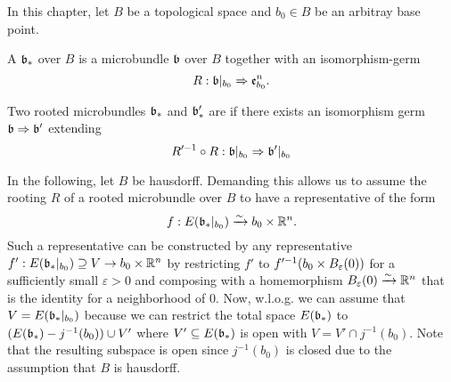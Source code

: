 In this chapter, let $B$ be a topological space and $b_0 \in B$ be an arbitray base point.
\begin{mydefinition}
    A  $\mathfrak{b}_*$ over $B$ is a microbundle $\mathfrak{b}$ over $B$ together with an isomorphism-germ
    \[ R: \mathfrak{b}\vert_{b_0} \Rightarrow{} \mathfrak{e}^n_{b_0}. \]

    Two rooted microbundles $\mathfrak{b}_*$ and $\mathfrak{b}'_*$ are  if there exists an isomorphism germ $\mathfrak{b} \Rightarrow{} \mathfrak{b}'$ extending
    \[ R'^{-1} \circ R: \mathfrak{b}\vert_{b_0} \Rightarrow{} \mathfrak{b}'\vert_{b_0} \]
\end{mydefinition}

\begin{myparagraph}
    In the following, let $B$ be hausdorff.
    Demanding this allows us to assume the rooting $R$ of a rooted microbundle over $B$ to have a representative of the form
    \[ f: E(\mathfrak{b}_*\vert_{b_0}) \xrightarrow{\sim} b_0 \times \mathbb{R}^n. \]
    Such a representative can be constructed by any representative $f': E(\mathfrak{b}_*\vert_{b_0}) \supseteq{} V \to b_0 \times \mathbb{R}^n$
    by restricting $f'$ to $f'^{-1}(b_0 \times \ball[\varepsilon])$ for a sufficiently small $\varepsilon > 0$ and
    composing with a homemorphism $\ball[\varepsilon] \isomto \R^n$ that is the identity for a neighborhood of $0$.
    Now, w.l.o.g. we can assume that $V = E(\mathfrak{b}_*\vert_{b_0})$ because we can restrict the total space $E(\mathfrak{b}_*)$
    to $(E(\mathfrak{b}_*) - j^{-1}(b_0)) \cup V'$ where $V' \subseteq{} E(\mathfrak{b}_*)$ is open with $V = V' \cap j^{-1}(b_0)$.
    Note that the resulting subspace is open since $j^{-1}(b_0)$ is closed due to the assumption that $B$ is hausdorff.
\end{myparagraph}